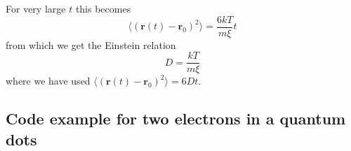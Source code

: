 For very large $t$ this becomes
\[
\langle (\mathbf{r}(t)-\mathbf{r}_{0})^{2}\rangle =\frac{6kT}{m\xi }t 
\] 
from which we get the Einstein relation  
 \[ 
D= \frac{kT}{m\xi } 
\] 	
where we have used $\langle (\mathbf{r}(t)-\mathbf{r}_{0})^{2}\rangle =6Dt$.

\subsection*{Code example for two electrons in a quantum dots}


































































































